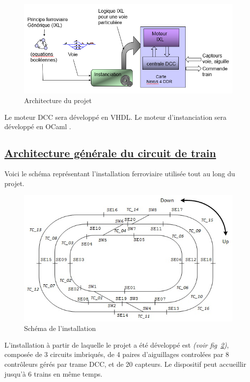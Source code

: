 \begin{figure}[ht]
\centering
\includegraphics[scale=0.45]{moteur.png}
\caption{Architecture du projet}
\label{archi}
\end{figure}

Le moteur DCC sera développé en VHDL. Le moteur d'instanciation sera
développé en OCaml \cite{OCAML}.


\newpage
\subsection{\underline{Architecture g\'en\'erale du circuit de train}}
\label{sec:archi}

Voici le sch\'ema repr\'esentant l'installation ferroviaire utilis\'ee
tout au long du projet. 

\begin{figure}[h]
\centering
\includegraphics[scale=0.55]{circuit_complet.jpg}
\caption{Sch\'ema de l'installation}
\label{fig4}
\end{figure}

L'installation à partir de laquelle le projet a été développé est
 \emph{(voir fig~\ref{fig4})}, compos\'ee de 3
circuits imbriqués, de 4 paires d'aiguillages control\'ees par 8
contr\^oleurs gérés par trame DCC, et de 20 capteurs.
Le dispositif peut accueillir jusqu'\`a 6 trains en m\^eme temps.

